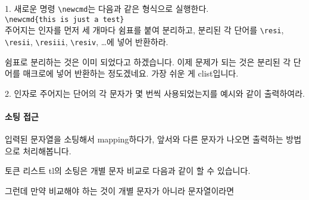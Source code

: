 \documentclass[a4paper,amsmath]{oblivoir}
\begin{document}
\clearpage

\begin{questionp}
 1. 새로운 명령 \verb|\newcmd|는 다음과 같은 형식으로 실행한다.\\
\verb|\newcmd{this is just a test}|\\
주어지는 인자를 먼저 세 개마다 쉼표를 붙여 분리하고, 분리된 각 단어를 \verb|\resi|, \verb|\resii|, \verb|\resiii|, \verb|\resiv|, \ldots 에 넣어 반환하라.
\end{questionp}

쉼표로 분리하는 것은 이미 되었다고 하겠습니다.
이제 문제가 되는 것은 분리된 각 단어를 매크로에 넣어 반환하는 정도겠네요.
가장 쉬운 게 clist입니다.



\newpage

\begin{questionp}
 2. 인자로 주어지는 단어의 각 문자가 몇 번씩 사용되었는지를 예시와 같이 출력하여라.
\end{questionp}

\paragraph{소팅 접근}

입력된 문자열을 소팅해서 mapping하다가, 앞서와 다른 문자가 나오면 출력하는 방법으로 처리해봅니다. 

토큰 리스트 tl의 소팅은 개별 문자 비교로 다음과 같이 할 수 있습니다.


그런데 만약 비교해야 하는 것이 개별 문자가 아니라 문자열이라면 

\end{document}
